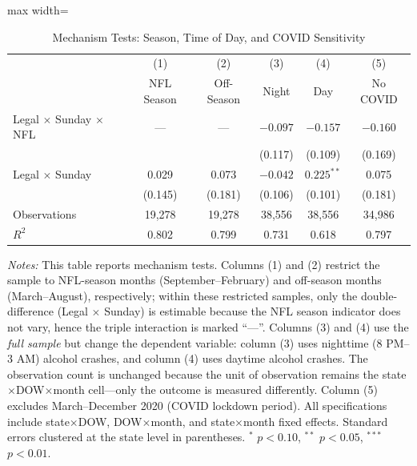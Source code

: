 \documentclass[12pt]{article}
\begin{document}
\begin{table}[H]
\centering
\caption{Mechanism Tests: Season, Time of Day, and COVID Sensitivity}
\label{tab:mechanism}
\begin{threeparttable}
\begin{adjustbox}{max width=\textwidth}
\begin{tabular}{lccccc}
\toprule
& (1) & (2) & (3) & (4) & (5) \\
& NFL Season & Off-Season & Night & Day & No COVID \\
\midrule
Legal $\times$ Sunday $\times$ NFL & --- & --- & $-0.097$ & $-0.157$ & $-0.160$ \\
& & & (0.117) & (0.109) & (0.169) \\[6pt]
Legal $\times$ Sunday & 0.029 & 0.073 & $-0.042$ & $0.225^{**}$ & 0.075 \\
& (0.145) & (0.181) & (0.106) & (0.101) & (0.181) \\[6pt]
\midrule
Observations & 19,278 & 19,278 & 38,556 & 38,556 & 34,986 \\
$R^2$ & 0.802 & 0.799 & 0.731 & 0.618 & 0.797 \\
\bottomrule
\end{tabular}
\end{adjustbox}
\begin{tablenotes}[flushleft]
\small
\item \emph{Notes:} This table reports mechanism tests. Columns (1) and (2) restrict the sample to NFL-season months (September--February) and off-season months (March--August), respectively; within these restricted samples, only the double-difference (Legal $\times$ Sunday) is estimable because the NFL season indicator does not vary, hence the triple interaction is marked ``---''. Columns (3) and (4) use the \emph{full sample} but change the dependent variable: column (3) uses nighttime (8 PM--3 AM) alcohol crashes, and column (4) uses daytime alcohol crashes. The observation count is unchanged because the unit of observation remains the state$\times$DOW$\times$month cell---only the outcome is measured differently. Column (5) excludes March--December 2020 (COVID lockdown period). All specifications include state$\times$DOW, DOW$\times$month, and state$\times$month fixed effects. Standard errors clustered at the state level in parentheses. $^{*}$ $p < 0.10$, $^{**}$ $p < 0.05$, $^{***}$ $p < 0.01$.
\end{tablenotes}
\end{threeparttable}
\end{table}
\end{document}
